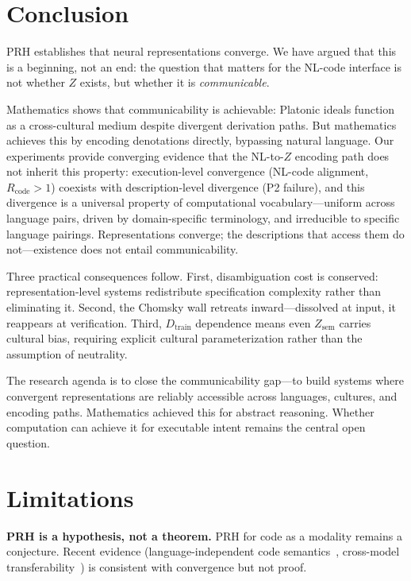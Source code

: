 \documentclass[11pt]{article}
\theoremstyle{definition}
\newcommand{\Zsem}{Z_{\text{sem}}}
\newcommand{\Dtrain}{D_{\text{train}}}
\begin{document}
\section{Conclusion}

PRH establishes that neural representations converge. We have argued that this is a beginning, not an end: the question that matters for the NL-code interface is not whether $Z$ exists, but whether it is \emph{communicable}.

Mathematics shows that communicability is achievable: Platonic ideals function as a cross-cultural medium despite divergent derivation paths. But mathematics achieves this by encoding denotations directly, bypassing natural language. Our experiments provide converging evidence that the NL-to-$Z$ encoding path does not inherit this property: execution-level convergence (NL-code alignment, $R_{\text{code}} > 1$) coexists with description-level divergence (P2 failure), and this divergence is a universal property of computational vocabulary---uniform across language pairs, driven by domain-specific terminology, and irreducible to specific language pairings. Representations converge; the descriptions that access them do not---existence does not entail communicability.

Three practical consequences follow. First, disambiguation cost is conserved: representation-level systems redistribute specification complexity rather than eliminating it. Second, the Chomsky wall retreats inward---dissolved at input, it reappears at verification. Third, $\Dtrain$ dependence means even $\Zsem$ carries cultural bias, requiring explicit cultural parameterization rather than the assumption of neutrality.

The research agenda is to close the communicability gap---to build systems where convergent representations are reliably accessible across languages, cultures, and encoding paths. Mathematics achieved this for abstract reasoning. Whether computation can achieve it for executable intent remains the central open question.


\section*{Limitations}

\textbf{PRH is a hypothesis, not a theorem.} PRH for code as a modality remains a conjecture. Recent evidence (language-independent code semantics~\cite{beyondsyntax2025}, cross-model transferability~\cite{chen2025crossmodel}) is consistent with convergence but not proof.
\end{document}
